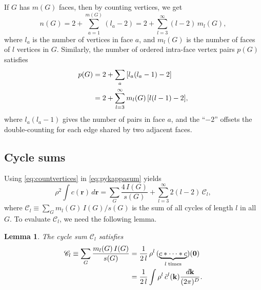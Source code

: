 \documentclass[preprint]{revtex4-1}
\newtheorem{lemm}[thrm]{Lemma}
\newcommand{\vct}[1]{\mathbf{#1}}
\providecommand{\vr}{} %
\renewcommand{\vr}{\vct{r}}
\newcommand{\vk}{\vct{k}}
\newcommand{\dvk}{\frac{d\vk}{(2\pi)^D}}
\newcommand{\Chn}{\mathscr{C}}
\begin{document}
If $G$ has $m(G)$ faces, then by counting vertices, we get
%
\begin{equation}
  n(G) = 2 + \sum_{a = 1}^{m(G)} (l_a - 2)
       = 2 + \sum_{l = 3}^\infty (l - 2) \, m_l(G),
\label{eq:countvertices}
\end{equation}
%
where
  $l_a$ is the number of vertices in face $a$,
%
and
  $m_l(G)$ is the number of faces of $l$ vertices in $G$.
%
Similarly, the number of ordered intra-face vertex pairs
  $p(G)$ satisfies
%
\begin{align}
  p(G)  &= 2 + \sum_{a} \left[ l_a (l_a - 1) - 2 \right]
                        \notag \\
        &= 2 + \sum_{l = 3}^\infty m_l(G) \, [l(l-1) - 2],
\label{eq:countpairs}
\end{align}
%
where $l_a (l_a - 1)$ gives the number of pairs in face $a$,
  and the ``$-2$'' %
  offsets the double-counting
  for each edge shared by two adjacent faces.




\subsection{Cycle sums}

Using \eqref{eq:countvertices} in \eqref{eq:pykappasum} yields
%
\begin{equation}
    \rho^2 \int c(\vr) \, d\vr
  = \sum_G \frac{ 4 \, I(G) }{ s(G) }
  + \sum_{l = 3}^\infty 2 (l - 2) \, \Chn_l,
\label{eq:pyintgcr2sums}
\end{equation}
%
where
$\Chn_l \equiv \sum_G m_l(G) \, I(G) / s(G)$
is the sum of all cycles of length $l$ in all $G$.
%
To evaluate $\Chn_l$, we need the following lemma.

\begin{lemm}
The cycle sum $\Chn_l$ satisfies
\begin{align}
      \Chn_l
  \equiv
      \sum_G \frac{ m_l(G) \, I(G) } { s(G) }
  &=  \frac{1}{2 \, l} \,
      \rho^l \, (\underbrace{c*\cdots *c}_{l \; \mathrm{times}})(\vct 0)
      \notag \\
  &=  \frac{1}{2 \, l}
      \int \rho^l \, \tilde{c}^l(\vk) \dvk.
\label{eq:ccycling}
\end{align}
%
\end{lemm}
\end{document}
